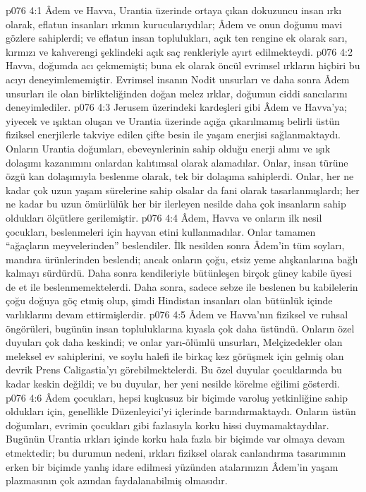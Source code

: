 \vs p076 4:1 Âdem ve Havva, Urantia üzerinde ortaya çıkan dokuzuncu insan ırkı olarak, eflatun insanları ırkının kurucularıydılar; Âdem ve onun doğumu mavi gözlere sahiplerdi; ve eflatun insan toplulukları, açık ten rengine ek olarak sarı, kırmızı ve kahverengi şeklindeki açık saç renkleriyle ayırt edilmekteydi.
\vs p076 4:2 Havva, doğumda acı çekmemişti; buna ek olarak öncül evrimsel ırkların hiçbiri bu acıyı deneyimlememiştir. Evrimsel insanın Nodit unsurları ve daha sonra Âdem unsurları ile olan birlikteliğinden doğan melez ırklar, doğumun ciddi sancılarını deneyimlediler.
\vs p076 4:3 Jerusem üzerindeki kardeşleri gibi Âdem ve Havva’ya; yiyecek ve ışıktan oluşan ve Urantia üzerinde açığa çıkarılmamış belirli üstün fiziksel enerjilerle takviye edilen çifte besin ile yaşam enerjisi sağlanmaktaydı. Onların Urantia doğumları, ebeveynlerinin sahip olduğu enerji alımı ve ışık dolaşımı kazanımını onlardan kalıtımsal olarak alamadılar. Onlar, insan türüne özgü kan dolaşımıyla beslenme olarak, tek bir dolaşıma sahiplerdi. Onlar, her ne kadar çok uzun yaşam sürelerine sahip olsalar da fani olarak tasarlanmışlardı; her ne kadar bu uzun ömürlülük her bir ilerleyen nesilde daha çok insanların sahip oldukları ölçütlere gerilemiştir.
\vs p076 4:4 Âdem, Havva ve onların ilk nesil çocukları, beslenmeleri için hayvan etini kullanmadılar. Onlar tamamen “ağaçların meyvelerinden” beslendiler. İlk nesilden sonra Âdem’in tüm soyları, mandıra ürünlerinden beslendi; ancak onların çoğu, etsiz yeme alışkanlarına bağlı kalmayı sürdürdü. Daha sonra kendileriyle bütünleşen birçok güney kabile üyesi de et ile beslenmemektelerdi. Daha sonra, sadece sebze ile beslenen bu kabilelerin çoğu doğuya göç etmiş olup, şimdi Hindistan insanları olan bütünlük içinde varlıklarını devam ettirmişlerdir.
\vs p076 4:5 Âdem ve Havva’nın fiziksel ve ruhsal öngörüleri, bugünün insan topluluklarına kıyasla çok daha üstündü. Onların özel duyuları çok daha keskindi; ve onlar yarı\hyp{}ölümlü unsurları, Melçizedekler olan meleksel ev sahiplerini, ve soylu halefi ile birkaç kez görüşmek için gelmiş olan devrik Prens Caligastia’yı görebilmektelerdi. Bu özel duyular çocuklarında bu kadar keskin değildi; ve bu duyular, her yeni nesilde körelme eğilimi gösterdi.
\vs p076 4:6 Âdem çocukları, hepsi kuşkusuz bir biçimde varoluş yetkinliğine sahip oldukları için, genellikle Düzenleyici’yi içlerinde barındırmaktaydı. Onların üstün doğumları, evrimin çocukları gibi fazlasıyla korku hissi duymamaktaydılar. Bugünün Urantia ırkları içinde korku hala fazla bir biçimde var olmaya devam etmektedir; bu durumun nedeni, ırkları fiziksel olarak canlandırma tasarımının erken bir biçimde yanlış idare edilmesi yüzünden atalarınızın Âdem’in yaşam plazmasının çok azından faydalanabilmiş olmasıdır.
